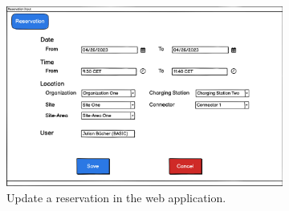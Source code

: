 \begin{figure}[h]
    \centering
    \begin{subfigure}[c]{0.6\textwidth}
        \includegraphics[width=\textwidth]{resources/images/main/5_design/mockups/update_reservation/web/Edit_Reservation.png}
        \captionsetup{skip=33pt}
        \caption{Update a reservation in the web application.}
        \label{fig:web-update-reservation-mockup}
    \end{subfigure}
     \hfill
     \begin{subfigure}[c]{0.3\textwidth}

\end{subfigure}
\end{figure}

